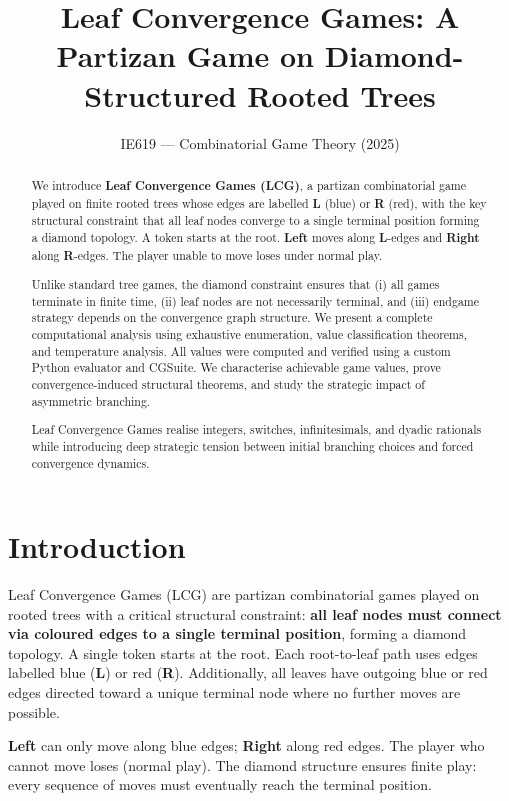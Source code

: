 \documentclass[10pt,a4paper,twocolumn]{article}
\title{Leaf Convergence Games: A Partizan Game on Diamond-Structured Rooted Trees}
\author{IE619 --- Combinatorial Game Theory (2025)}
\date{}
\newcommand{\Lopt}[1]{{\color{lblue}\textbf{#1}}}
\newcommand{\Ropt}[1]{{\color{rred}\textbf{#1}}}
\theoremstyle{plain}
\theoremstyle{definition}
\theoremstyle{remark}
\begin{document}
\maketitle

\begin{abstract}
We introduce \textbf{Leaf Convergence Games (LCG)}, a partizan combinatorial game played on finite rooted trees whose edges are labelled \Lopt{L} (blue) or \Ropt{R} (red), with the key structural constraint that all leaf nodes converge to a single terminal position forming a diamond topology. A token starts at the root. \Lopt{Left} moves along \Lopt{L}-edges and \Ropt{Right} along \Ropt{R}-edges. The player unable to move loses under normal play. 

Unlike standard tree games, the diamond constraint ensures that (i) all games terminate in finite time, (ii) leaf nodes are not necessarily terminal, and (iii) endgame strategy depends on the convergence graph structure. We present a complete computational analysis using exhaustive enumeration, value classification theorems, and temperature analysis. All values were computed and verified using a custom Python evaluator and CGSuite. We characterise achievable game values, prove convergence-induced structural theorems, and study the strategic impact of asymmetric branching.

Leaf Convergence Games realise integers, switches, infinitesimals, and dyadic rationals while introducing deep strategic tension between initial branching choices and forced convergence dynamics.
\end{abstract}

\section{Introduction}

Leaf Convergence Games (LCG) are partizan combinatorial games played on rooted trees with a critical structural constraint: \textbf{all leaf nodes must connect via coloured edges to a single terminal position}, forming a diamond topology. A single token starts at the root. Each root-to-leaf path uses edges labelled blue (\Lopt{L}) or red (\Ropt{R}). Additionally, all leaves have outgoing blue or red edges directed toward a unique terminal node where no further moves are possible.

\Lopt{Left} can only move along blue edges; \Ropt{Right} along red edges. The player who cannot move loses (normal play). The diamond structure ensures finite play: every sequence of moves must eventually reach the terminal position.
\end{document}

